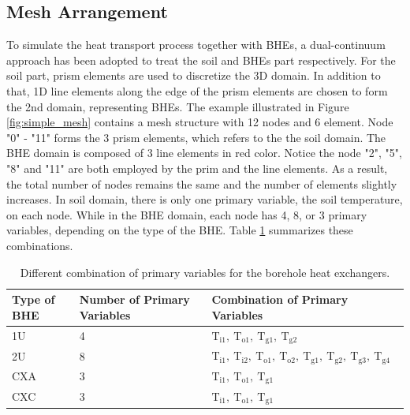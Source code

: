\subsection{Mesh Arrangement}
\label{sec:mesh_arrangement}
To simulate the heat transport process together with BHEs, a dual-continuum approach has been adopted to treat the soil and BHEs part respectively. For the soil part, prism elements are used to discretize the 3D domain. In addition to that, 1D line elements along the edge of the prism elements are chosen to form the 2nd domain, representing BHEs. The example illustrated in Figure \ref{fig:simple_mesh} contains a mesh structure with 12 nodes and 6 element. Node "0" - "11" forms the 3 prism elements, which refers to the the soil domain. The BHE domain is composed of 3 line elements in red color. Notice the node "2", "5", "8" and "11" are both employed by the prim and the line elements. As a result, the total number of nodes remains the same and the number of elements slightly increases. In soil domain, there is only one primary variable, the soil temperature, on each node. While in the BHE domain, each node has 4, 8, or 3 primary variables, depending on the type of the BHE. Table \ref{tab:bhe_primary_variables} summarizes these combinations. 
\begin{table}
\caption{Different combination of primary variables for the borehole heat exchangers. }
\label{tab:bhe_primary_variables}
\centering
\begin{tabular}{l l l}
\hline
Type of BHE    & Number of Primary Variables & Combination of Primary Variables \\
\hline
1U             & 4 & $\mathrm{T_{i1},~T_{o1},~T_{g1},~T_{g2}}$\\
2U             & 8 & $\mathrm{T_{i1},~T_{i2},~T_{o1},~T_{o2},~T_{g1},~T_{g2},~T_{g3},~T_{g4}}$\\
CXA            & 3 & $\mathrm{T_{i1},~T_{o1},~T_{g1}}$\\
CXC            & 3 & $\mathrm{T_{i1},~T_{o1},~T_{g1}}$ \\
\hline
\end{tabular}
\end{table}

